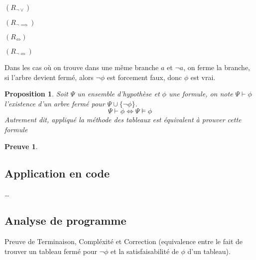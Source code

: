 \documentclass{paper}
\newtheorem{prop}{Proposition}
\newtheorem{preuve}{Preuve}
\begin{document}
$(R_{\lnot\lor})$
$(R_{\lnot\implies})$
$(R_{\Leftrightarrow})$
$(R_{\lnot\Leftrightarrow})$

Dans les cas où on trouve dans une même branche $a$ et $\lnot a$, on ferme la branche, si l'arbre devient fermé, alors $\lnot\phi$ est forcement faux, donc $\phi$ est vrai.

\begin{prop}
    Soit $\Psi$ un ensemble d'hypothèse et $\phi$ une formule, on note $\Psi\vdash\phi$ l'existence d'un arbre fermé pour $\Psi\cup\{\lnot\phi\}$.
    $$\Psi\vdash\phi \Leftrightarrow \Psi\vDash\phi$$
    Autrement dit, appliqué la méthode des tableaux est équivalent à prouver cette formule
\end{prop}

\begin{preuve}
\end{preuve}

\subsection{Application en code}
\dots

\subsection{Analyse de programme}
Preuve de Terminaison, Compléxité et Correction (equivalence entre le fait de trouver un tableau fermé pour $\lnot\phi$ et la satisfaisabilité de $\phi$ d'un tableau).
\end{document}
